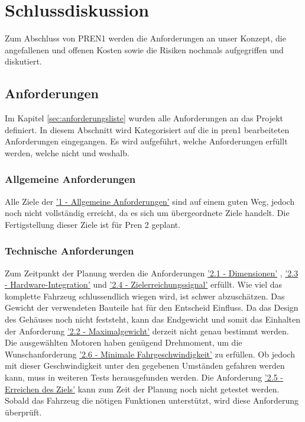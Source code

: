 \documentclass[../main.tex]{subfiles}
\begin{document}
\newpage
\section{Schlussdiskussion}

Zum Abschluss von PREN1 werden die Anforderungen an unser Konzept, die angefallenen und offenen Kosten sowie die Risiken nochmals aufgegriffen und diskutiert.

\subsection{Anforderungen}

Im Kapitel \ref{sec:anforderungsliste} wurden alle Anforderungen an das Projekt definiert.
In diesem Abschnitt wird Kategorisiert auf die in \acrshort{pren1}
bearbeiteten Anforderungen eingegangen. Es wird aufgeführt, welche Anforderungen erfüllt werden, welche nicht und weshalb. 

\subsubsection{Allgemeine Anforderungen}
Alle Ziele der \hyperlink{A1}{'1 - Allgemeine Anforderungen'} sind auf einem guten Weg, jedoch noch nicht vollständig erreicht, da es sich um übergeordnete Ziele handelt. Die Fertigstellung dieser Ziele ist für Pren 2 geplant.

\subsubsection{Technische Anforderungen}
Zum Zeitpunkt der Planung werden die Anforderungen \hyperlink{A2.1}{'2.1 - Dimensionen'} , \hyperlink{A2.3}{'2.3 - Hardware-Integration'} und \hyperlink{A2.4}{'2.4 - Zielerreichungssignal'} erfüllt. Wie viel das komplette Fahrzeug schlussendlich wiegen wird, ist schwer abzuschätzen. Das Gewicht der verwendeten Bauteile hat für den Entscheid Einfluss. Da das Design des Gehäuses noch nicht feststeht, kann das Endgewicht und somit das Einhalten der Anforderung \hyperlink{A2.2}{'2.2 - Maximalgewicht'} derzeit nicht genau bestimmt werden. Die ausgewählten Motoren haben genügend Drehmoment, um die Wunschanforderung \hyperlink{A2.6}{'2.6 - Minimale Fahrgeschwindigkeit'} zu erfüllen. Ob jedoch mit dieser Geschwindigkeit unter den gegebenen Umständen gefahren werden kann, muss in weiteren Tests herausgefunden werden.
Die Anforderung \hyperlink{A2.5}{'2.5 - Erreichen des Ziels'} kann zum Zeit der Planung noch nicht getestet werden. Sobald das Fahrzeug die nötigen Funktionen unterstützt, wird diese Anforderung überprüft.
\end{document}
